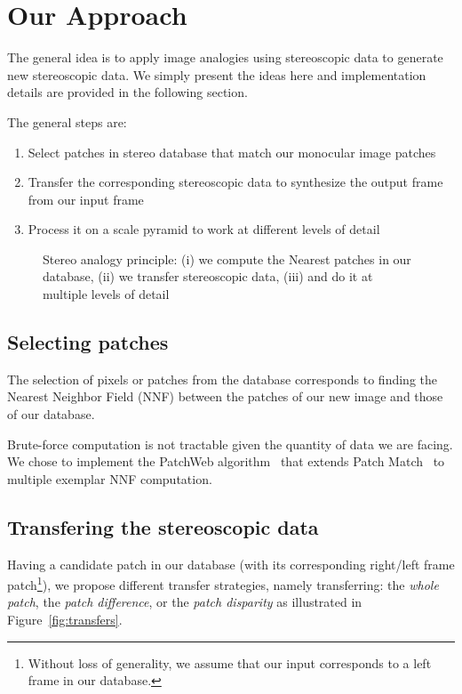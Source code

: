 
\section{Our Approach}

The general idea is to apply image analogies using stereoscopic data to generate new stereoscopic data.
We simply present the ideas here and implementation details are provided in the following section.

The general steps are:
\begin{enumerate}
	\item Select patches in stereo database that match our monocular image patches
	\item Transfer the corresponding stereoscopic data to synthesize the output frame from our input frame
	\item Process it on a scale pyramid to work at different levels of detail
\end{enumerate}

\begin{figure}
	\centering
	\caption{Stereo analogy principle: (i) we compute the Nearest patches in our database, (ii) we transfer stereoscopic data, (iii) and do it at multiple levels of detail}
\end{figure}

\subsection{Selecting patches}
The selection of pixels or patches from the database corresponds to finding the Nearest Neighbor Field (NNF) between the patches of our new image and those of our database.

Brute-force computation is not tractable given the quantity of data we are facing.
We chose to implement the PatchWeb algorithm~\cite{Barnes11} that extends Patch Match~\cite{Barnes09} to multiple exemplar NNF computation.

\subsection{Transfering the stereoscopic data}
Having a candidate patch in our database (with its corresponding right/left frame patch\footnote{Without loss of generality, we assume that our input corresponds to a left frame in our database.}), we propose different transfer strategies, namely transferring: the \emph{whole patch}, the \emph{patch difference}, or the \emph{patch disparity} as illustrated in Figure~\ref{fig:transfers}.

